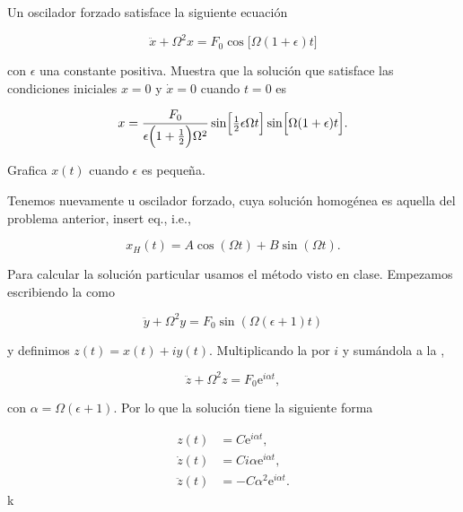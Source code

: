 \documentclass[../main.tex]{subfiles}
\begin{document}
\begin{problema}
	Un oscilador forzado satisface la siguiente ecuación

	\begin{equation}
		\ddot{x} + \Omega^{2}x = F_{0}\cos \biggl[\Omega(1 + \epsilon)t\biggr]
	\end{equation}

	con \(\epsilon\) una constante positiva. Muestra que la solución
	que satisface las condiciones iniciales \(x = 0\) y
	\(\dot{x} = 0\) cuando \(t = 0\) es

	\begin{equation}
		x = \dfrac{F_{0}}{\epsilon \Bigl(1 + \tfrac{1}{2}\Bigr)\Omega^{2}}\sin \Bigl[\tfrac{1}{2}\epsilon\Omega t\Bigr]\sin \Bigl[\Omega(1 + \epsilon)t\Bigr].
	\end{equation}

	Grafica \(x(t)\) cuando \(\epsilon\) es pequeña.
\end{problema}

\startsolution

Tenemos nuevamente u oscilador forzado, cuya solución homogénea es aquella del problema anterior, insert eq., i.e.,

\begin{equation}
	x_{H}(t) =A\cos(\Omega t) + B\sin(\Omega t).
	\label{eq:homogeneous-sol}
\end{equation}

Para calcular la solución particular usamos el método visto en clase. Empezamos escribiendo la 
como

\begin{equation}
	\ddot{y} + \Omega^{2}y = F_{0}\sin(\Omega(\epsilon + 1)t)
	\label{eq:h-sol-in-y}
\end{equation}

y definimos \(z(t) = x(t) + i y(t)\). Multiplicando la  por \(i\) y
sumándola a la ,

\begin{equation}
	\ddot{z} + \Omega^{2}z = F_{0}\mathrm{e}^{i\alpha t},
	\label{eq:complex-sol}
\end{equation}

con \(\alpha = \Omega(\epsilon + 1)\). Por lo que la solución tiene la siguiente forma

\begin{align}
	z(t)        & = C \mathrm{e}^{i\alpha t},\label{eq:z-sol}    \\
	\dot{z}(t)  & = Ci\alpha \mathrm{e}^{i\alpha t},\nonumber    \\
	\ddot{z}(t) & = -C\alpha^{2}\mathrm{e}^{i\alpha t}.\nonumber
\end{align}k
\end{document}
